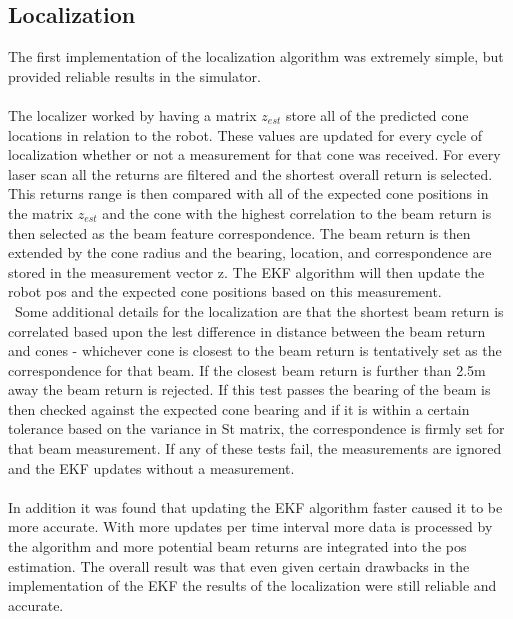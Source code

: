 \documentclass[letterpaper,12pt]{article}
\begin{document}
\subsection*{Localization} 
The first implementation of the localization algorithm was extremely simple, but provided reliable results in the simulator.
\\\\
The localizer worked by having a matrix $z_{est}$ store all of the predicted cone locations in relation to the robot. These values are updated for every cycle of localization whether or not a measurement for that cone was received. For every laser scan all the returns are filtered and the shortest overall return is selected. This returns range is then compared with all of the expected cone positions in the matrix $z_{est}$ and the cone with the highest correlation to the beam return is then selected as the beam feature correspondence. The beam return is then extended by the cone radius and the bearing, location, and correspondence are stored in the measurement vector z. The EKF algorithm will then update the robot pos and the expected cone positions based on this measurement. 
\\\
Some additional details for the localization are that the shortest beam return is correlated based upon the lest difference in distance between the beam return and cones - whichever cone is closest to the beam return is tentatively set as the correspondence for that beam. If the closest beam return is further than 2.5m away the beam return is rejected. If this test passes the bearing of the beam is then checked against the expected cone bearing and if it is within a certain tolerance based on the variance in St matrix, the correspondence is firmly set for that beam measurement. If any of these tests fail, the measurements are ignored and the EKF updates without a measurement. 
\\\\ 
In addition it was found that updating the EKF algorithm faster caused it to be more accurate. With more updates per time interval more data is processed by the algorithm and more potential beam returns are integrated into the pos estimation. The overall result was that even given certain drawbacks in the implementation of the EKF the results of the localization were still reliable and accurate. 
\\\\
\end{document}
